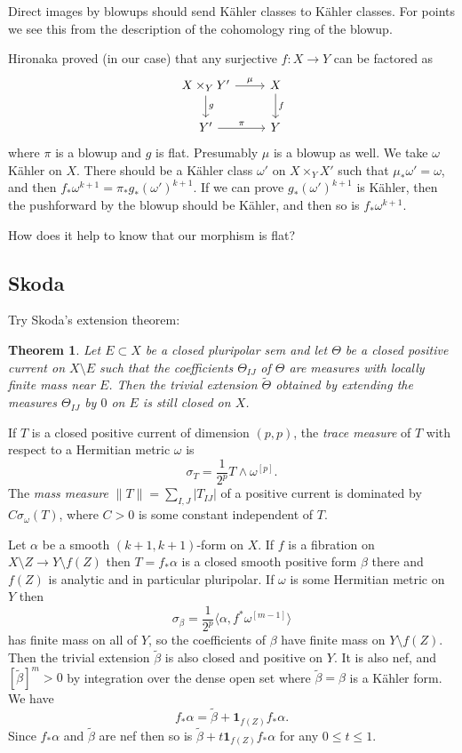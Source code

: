 \documentclass[11pt]{amsart}
\newtheorem{theo}{Theorem}
\theoremstyle{definition}
\def\^#1{^{[#1]}}
\def\<{\langle}
\def\>{\rangle}
\begin{document}
Direct images by blowups should send K\"ahler classes to K\"ahler classes.
For points we see this from the description of the cohomology ring of the blowup.

Hironaka proved (in our case) that any surjective $f : X \to Y$ can be factored as
\[
\begin{tikzcd}
X \times_Y Y' \ar[d,"g"] \ar[r,"\mu"] &
X \ar[d,"f"]
\\
Y' \ar[r,"\pi"] &
Y
\end{tikzcd}
\]
where $\pi$ is a blowup and $g$ is flat.
Presumably $\mu$ is a blowup as well.
We take $\omega$ K\"ahler on $X$.
There should be a K\"ahler class $\omega'$ on $X \times_Y X'$ such that $\mu_*\omega' = \omega$, and then $f_*\omega^{k+1} = \pi_* g_* (\omega')^{k+1}$.
If we can prove $g_* (\omega')^{k+1}$ is K\"ahler, then the pushforward by the blowup should be K\"ahler, and then so is $f_*\omega^{k+1}$.

How does it help to know that our morphism is flat?



\subsection*{Skoda}

Try Skoda's extension theorem:


\begin{theo}
Let $E \subset X$ be a closed pluripolar sem and let $\Theta$ be a closed positive current on $X \setminus E$ such that the coefficients $\Theta_{IJ}$ of $\Theta$ are measures with locally finite mass near $E$.
Then the trivial extension $\tilde \Theta$ obtained by extending the measures $\Theta_{IJ}$ by $0$ on $E$ is still closed on $X$.
\end{theo}


If $T$ is a closed positive current of dimension $(p,p)$, the \emph{trace measure} of $T$ with respect to a Hermitian metric $\omega$ is
\[
\sigma_T = \frac{1}{2^p} T \wedge \omega\^p.
\]
The \emph{mass measure} $\|T\| = \sum_{I,J} |T_{IJ}|$ of a positive current is dominated by $C \sigma_\omega(T)$, where $C > 0$ is some constant independent of $T$.


Let $\alpha$ be a smooth $(k+1,k+1)$-form on $X$.
If $f$ is a fibration on $X \setminus Z \to Y \setminus f(Z)$ then $T = f_*\alpha$ is a closed smooth positive form $\beta$ there and $f(Z)$ is analytic and in particular pluripolar.
If $\omega$ is some Hermitian metric on $Y$ then
\[
\sigma_{\beta} = \frac{1}{2^p} \< \alpha, f^* \omega\^{m-1} \>
\]
has finite mass on all of $Y$, so the coefficients of $\beta$ have finite mass on $Y \setminus f(Z)$.
Then the trivial extension $\tilde\beta$ is also closed and positive on $Y$.
It is also nef, and $[\tilde\beta]^m > 0$ by integration over the dense open set where $\tilde\beta = \beta$ is a K\"ahler form.
We have
\[
f_*\alpha = \tilde\beta + \mathbf{1}_{f(Z)} f_* \alpha.
\]
Since $f_*\alpha$ and $\tilde\beta$ are nef then so is $\tilde\beta + t \mathbf{1}_{f(Z)} f_*\alpha$ for any $0 \leq t \leq 1$.
\end{document}
